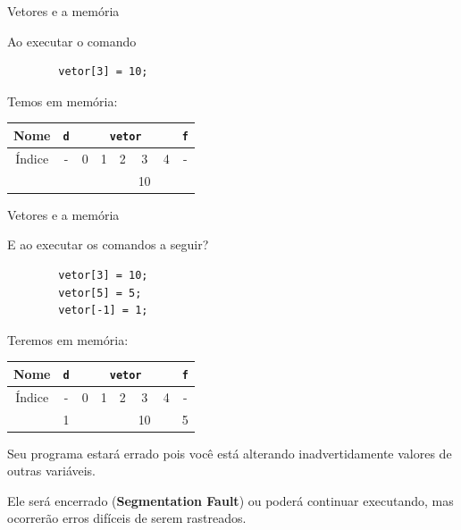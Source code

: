 \documentclass[handout]{beamer}
\newcommand{\cod}[1]{\texttt{#1}}
\begin{document}
\begin{frame}[fragile]{Vetores e a memória}

    Ao executar o comando
    \begin{verbatim}
        vetor[3] = 10;
    \end{verbatim}

    Temos em memória:

    \begin{center}
        \begin{tabular}{|c|c|c|c|c|c|c|c|}
          \hline
          Nome & \cod{d} & \multicolumn{5}{|c|}{\cod{vetor}} & \cod{f} \\
          \hline
          Índice & - & 0 & 1 & 2 & 3 & 4 & - \\
          \hline
               & & & & & 10 & & \\
          \hline
        \end{tabular}
    \end{center}

\end{frame}

\begin{frame}[fragile]{Vetores e a memória}

    \small
    E ao executar os comandos a seguir?
    \begin{verbatim}
        vetor[3] = 10;
        vetor[5] = 5;
        vetor[-1] = 1;
    \end{verbatim}

    Teremos em memória:

    \begin{center}
        \begin{tabular}{|c|c|c|c|c|c|c|c|}
          \hline
          Nome & \cod{d} & \multicolumn{5}{|c|}{\cod{vetor}} & \cod{f} \\
          \hline
          Índice & - & 0 & 1 & 2 & 3 & 4 & - \\
          \hline
               & 1 & & & & 10 & & 5 \\
          \hline
        \end{tabular}
    \end{center}

    Seu programa estará errado pois você está alterando inadvertidamente valores de outras variáveis.

    Ele será encerrado ({\bf Segmentation Fault}) ou poderá continuar executando, mas ocorrerão erros difíceis de serem rastreados.

\end{frame}
\end{document}
